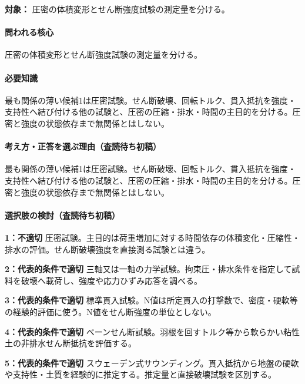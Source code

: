 \noindent\textbf{対象：} 圧密の体積変形とせん断強度試験の測定量を分ける。\par

\paragraph{問われる核心} 圧密の体積変形とせん断強度試験の測定量を分ける。

\paragraph{必要知識} 最も関係の薄い候補1は圧密試験。せん断破壊、回転トルク、貫入抵抗を強度・支持性へ結び付ける他の試験と、圧密の圧縮・排水・時間の主目的を分ける。圧密と強度の状態依存まで無関係とはしない。

\paragraph{考え方・正答を選ぶ理由（査読待ち初稿）} 最も関係の薄い候補1は圧密試験。せん断破壊、回転トルク、貫入抵抗を強度・支持性へ結び付ける他の試験と、圧密の圧縮・排水・時間の主目的を分ける。圧密と強度の状態依存まで無関係とはしない。

\paragraph{選択肢の検討（査読待ち初稿）}\mbox{}\par

\noindent\textbf{1：不適切} 圧密試験。主目的は荷重増加に対する時間依存の体積変化・圧縮性・排水の評価。せん断破壊強度を直接測る試験とは違う。\par

\noindent\textbf{2：代表的条件で適切} 三軸又は一軸の力学試験。拘束圧・排水条件を指定して試料を破壊へ載荷し、強度や応力ひずみ応答を調べる。\par

\noindent\textbf{3：代表的条件で適切} 標準貫入試験。N値は所定貫入の打撃数で、密度・硬軟等の経験的評価に使う。N値をせん断強度の単位としない。\par

\noindent\textbf{4：代表的条件で適切} ベーンせん断試験。羽根を回すトルク等から軟らかい粘性土の非排水せん断抵抗を評価する。\par

\noindent\textbf{5：代表的条件で適切} スウェーデン式サウンディング。貫入抵抗から地盤の硬軟や支持性・土質を経験的に推定する。推定量と直接破壊試験を区別する。\par


